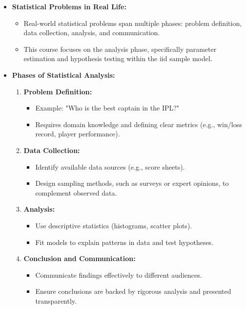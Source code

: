 \documentclass{article}
\begin{document}
\begin{itemize}
  \item \textbf{Statistical Problems in Real Life:}
    \begin{itemize}
      \item Real-world statistical problems span multiple phases: problem definition, data collection, analysis, and communication.
      \item This course focuses on the analysis phase, specifically parameter estimation and hypothesis testing within the iid sample model.
    \end{itemize}

  \item \textbf{Phases of Statistical Analysis:}
    \begin{enumerate}
      \item \textbf{Problem Definition:}
        \begin{itemize}
          \item Example: "Who is the best captain in the IPL?"
          \item Requires domain knowledge and defining clear metrics (e.g., win/loss record, player performance).
        \end{itemize}
      \item \textbf{Data Collection:}
        \begin{itemize}
          \item Identify available data sources (e.g., score sheets).
          \item Design sampling methods, such as surveys or expert opinions, to complement observed data.
        \end{itemize}
      \item \textbf{Analysis:}
        \begin{itemize}
          \item Use descriptive statistics (histograms, scatter plots).
          \item Fit models to explain patterns in data and test hypotheses.
        \end{itemize}
      \item \textbf{Conclusion and Communication:}
        \begin{itemize}
          \item Communicate findings effectively to different audiences.
          \item Ensure conclusions are backed by rigorous analysis and presented transparently.
        \end{itemize}
    \end{enumerate}


\end{itemize}
\end{document}

